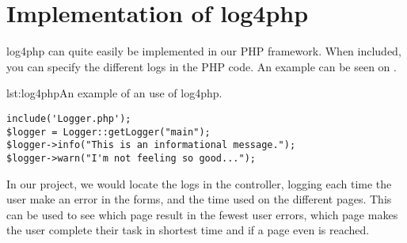 \section{Implementation of log4php}
log4php can quite easily be implemented in our PHP framework. When included, you can specify the different logs in the PHP code. An example can be seen on .

\begin{code}{lst:log4php}{An example of an use of log4php.}
\begin{lstlisting}
include('Logger.php');
$logger = Logger::getLogger("main");
$logger->info("This is an informational message.");
$logger->warn("I'm not feeling so good...");
\end{lstlisting}
\end{code}

In our project, we would locate the logs in the controller, logging each time the user make an error in the forms, and the time used on the different pages. This can be used to see which page result in the fewest user errors, which page makes the user complete their task in shortest time and if a page even is reached.